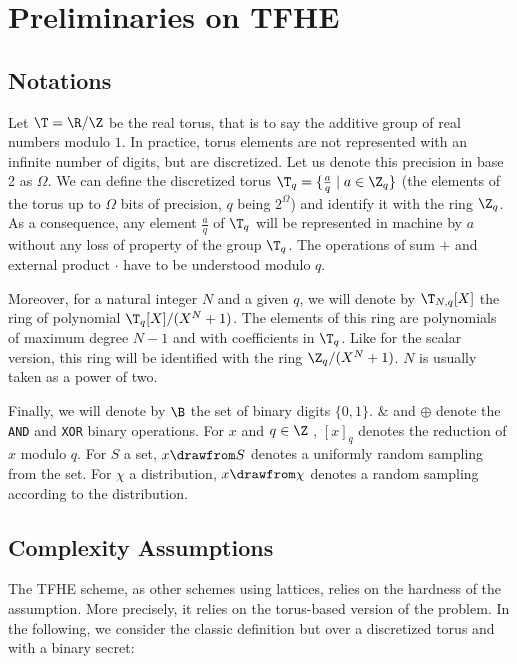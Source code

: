 \section{Preliminaries on TFHE}
\label{sec:preliminaries}



\subsection{Notations}

Let $\T = \R/\Z$ be the real torus, that is to say the additive group of real numbers modulo $1$. In practice, torus elements are not represented with an infinite number of digits, but are discretized. Let us denote this precision in base 2 as $\Omega$. We can define the discretized torus $\T_q = \{\frac a q \mid a \in \Z_q\}$ (the elements of the torus up to $\Omega$ bits of precision, $q$ being $2^\Omega$) and identify it with the ring $\Z_q$. As a consequence, any element $\frac a q$ of $\T_q$ will be represented in machine by $a$ without any loss of property of the group $\T_q$. The operations of sum $+$ and external product $\cdot$ have to be understood modulo $q$.

Moreover, for a natural integer $N$ and a given $q$, we will denote by $\T_{N, q}[X]$ the ring of polynomial $\T_q[X]/(X^N + 1)$. The elements of this ring are polynomials of maximum degree $N-1$ and with coefficients in $\T_q$. Like for the scalar version, this ring will be identified with the ring $\Z_q/(X^N + 1)$. $N$ is usually taken as a power of two.

Finally, we will denote by $\B$ the set of binary digits $\{0, 1\}$.  $\&$ and $\oplus$ denote the \texttt{AND} and \texttt{XOR} binary operations. For $x$ and $q \in \Z$ , $[x]_q$ denotes the reduction of $x$ modulo $q$. For $S$ a set, $x \drawfrom S$ denotes a uniformly random sampling from the set. For $\chi$ a distribution, $x \drawfrom \chi$ denotes a  random sampling according to the distribution.


\subsection{Complexity Assumptions}
\label{sec:complexity}

The TFHE scheme, as other schemes using lattices, relies on the hardness of the \LWE assumption. More precisely, it relies on the torus-based version of the problem. In the following, we consider the classic definition but over a discretized torus and with a binary secret:


